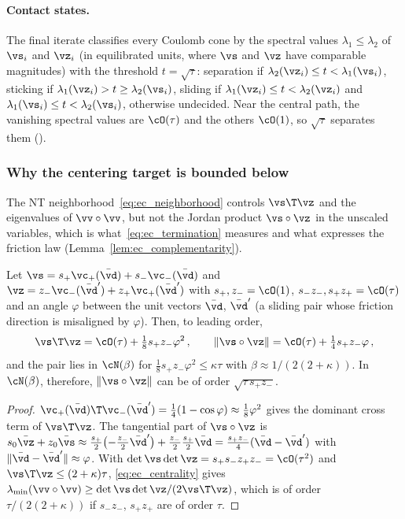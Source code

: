 \paragraph{Contact states.} The final iterate classifies every Coulomb cone by the spectral values $\lambda_1 \leq \lambda_2$ of $\vs_i$ and $\vz_i$ (in equilibrated units, where $\vs$ and $\vz$ have comparable magnitudes) with the threshold $t = \sqrt{\tau}$: separation if $\lambda_2(\vz_i) \leq t < \lambda_1(\vs_i)$, sticking if $\lambda_1(\vz_i) > t \geq \lambda_2(\vs_i)$, sliding if $\lambda_1(\vz_i) \leq t < \lambda_2(\vz_i)$ and $\lambda_1(\vs_i) \leq t < \lambda_2(\vs_i)$, otherwise undecided. Near the central path, the vanishing spectral values are $\cO(\tau)$ and the others $\cO(1)$, so $\sqrt{\tau}$ separates them ().
%
\subsubsection{Why the centering target is bounded below}\label{sec:ec_floor}
%
The NT neighborhood~\eqref{eq:ec_neighborhood} controls $\vs\T\vz$ and the eigenvalues of $\vv\circ\vv$, but not the Jordan product $\vs\circ\vz$ in the unscaled variables, which is what~\eqref{eq:ec_termination} measures and what expresses the friction law (Lemma~\ref{lem:ec_complementarity}).
%
\begin{proposition}\label{prop:ec_misalignment}
	Let $\vs = s_+\vc_+(\bar{\vd}) + s_-\vc_-(\bar{\vd})$ and $\vz = z_-\vc_-(\bar{\vd}') + z_+\vc_+(\bar{\vd}')$ with $s_+, z_- = \cO(1)$, $s_-z_-, s_+z_+ = \cO(\tau)$ and an angle $\varphi$ between the unit vectors $\bar{\vd}$, $\bar{\vd}'$ (a sliding pair whose friction direction is misaligned by $\varphi$). Then, to leading order,
	\begin{equation}
		\vs\T\vz = \cO(\tau) + \tfrac{1}{8}s_+z_-\varphi^2 \, , \qquad
		\|\vs\circ\vz\| = \cO(\tau) + \tfrac{1}{4}s_+z_-\varphi \, ,
	\end{equation}
	and the pair lies in $\cN(\beta)$ for $\tfrac{1}{8}s_+z_-\varphi^2 \leq \kappa\tau$ with $\beta \approx 1/(2(2 + \kappa))$. In $\cN(\beta)$, therefore, $\|\vs\circ\vz\|$ can be of order $\sqrt{\tau\,s_+z_-}$.
\end{proposition}
%
\begin{proof}
	$\vc_+(\bar{\vd})\T\vc_-(\bar{\vd}') = \frac{1}{4}(1 - \cos\varphi) \approx \frac{1}{8}\varphi^2$ gives the dominant cross term of $\vs\T\vz$. The tangential part of $\vs\circ\vz$ is $s_0\bar{\vz} + z_0\bar{\vs} \approx \frac{s_+}{2}\big({-\frac{z_-}{2}}\bar{\vd}'\big) + \frac{z_-}{2}\frac{s_+}{2}\bar{\vd} = \frac{s_+z_-}{4}(\bar{\vd} - \bar{\vd}')$ with $\|\bar{\vd} - \bar{\vd}'\| \approx \varphi$. With $\det\vs\det\vz = s_+s_-z_+z_- = \cO(\tau^2)$ and $\vs\T\vz \leq (2 + \kappa)\tau$, \eqref{eq:ec_centrality} gives $\lambda_{\min}(\vv\circ\vv) \geq \det\vs\det\vz/(2\vs\T\vz)$, which is of order $\tau/(2(2 + \kappa))$ if $s_-z_-$, $s_+z_+$ are of order $\tau$.
\end{proof}
